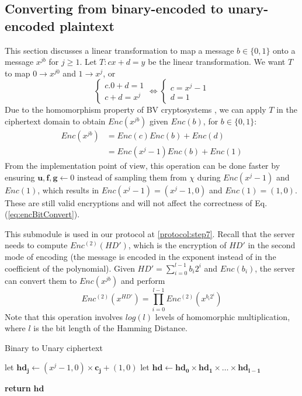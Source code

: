 \subsection{Converting from binary-encoded to unary-encoded plaintext}
\label{sec:binToUna}
This section discusses a linear transformation to map a message $b \in \{0,1\}$
onto a message $x^{jb}$ for $j \geq 1$. Let $T: cx + d = y$ be the linear transformation. We want $T$ to map $0 \rightarrow x^{j0} $ and
$1 \rightarrow x^j$, or
\[
  \begin{cases}
    c.0 + d = 1\\
    c + d = x^j
  \end{cases}
  \Leftrightarrow
  \begin{cases}
    c = x^j - 1\\
    d = 1
  \end{cases}
\]
Due to the homomorphism property of BV cryptosystems , we can apply
$T$ in the ciphertext domain to obtain $Enc(x^{jb})$ given $Enc(b)$,
for $b \in \{0,1\}$:
\begin{align}
  \label{eq:encBitConvert}
  Enc(x^{jb}) &= Enc(c)Enc(b) + Enc(d) \nonumber \\
              &= Enc(x^j - 1)Enc(b) + Enc(1)
\end{align}
From the implementation point of view, this operation can be done faster
by ensuring $\mathbf{u}, \mathbf{f}, \mathbf{g} \gets 0$ instead of sampling them from
$\chi$ during $Enc(x^j -1)$ and $Enc(1)$, which results in $Enc(x^j -1) = (x^j - 1, 0)$ and $Enc(1) = (1,0)$. These are still valid encryptions and will not affect the correctness of Eq. (\ref{eq:encBitConvert}).

This submodule is used in our protocol at \ref{protocol:step7}. Recall that the server needs
to compute $Enc^{(2)}(HD')$, which is the encryption of $HD'$ in the second mode
of encoding (the message is encoded in the exponent instead of in the coefficient of the
polynomial). Given $HD' = \sum_{i=0}^{l-1}b_i2^i$ and $Enc(b_i)$, the server can convert them to $Enc(x^{jb})$ and perform
\[
  Enc^{(2)}(x^{HD'}) = \prod_{i=0}^{l-1}Enc^{(2)}(x^{b_i2^i})
\]
Note that this operation involves $log(l)$ levels of homomorphic multiplication, where
$l$ is the bit length of the Hamming Distance.
\begin{algorithm}
  \caption{Binary to Unary ciphertext}\label{alg:ToUnary}
  \begin{algorithmic}[1]
    \State let $\mathbf{hd_j} \gets (x^j - 1,0)\times \mathbf{c_j} + (1,0)$
    \EndFor
    \State let $\mathbf{hd} \gets \mathbf{hd_0} \times \mathbf{hd_1} \times \dots
    \times \mathbf{hd_{l-1}}$


    \State \textbf{return} $\mathbf{hd}$
    \EndProcedure
  \end{algorithmic}
\end{algorithm}


